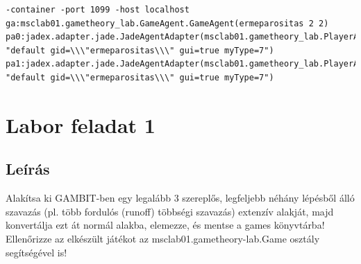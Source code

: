 \begin{lstlisting}[caption=érmepárosítás run config, frame=single,float=!ht]
-container -port 1099 -host localhost 
ga:msclab01.gametheory_lab.GameAgent.GameAgent(ermeparositas 2 2) 
pa0:jadex.adapter.jade.JadeAgentAdapter(msclab01.gametheory_lab.PlayerAgent.Player 
"default gid=\\\"ermeparositas\\\" gui=true myType=7") 
pa1:jadex.adapter.jade.JadeAgentAdapter(msclab01.gametheory_lab.PlayerAgent.Player 
"default gid=\\\"ermeparositas\\\" gui=true myType=7")
\end{lstlisting}
		



\section{Labor feladat 1}
\subsection{Leírás}
Alakítsa ki GAMBIT-ben egy legalább 3 szereplős, legfeljebb néhány lépésből álló szavazás (pl. több fordulós (runoff) többségi szavazás) extenzív alakját, majd konvertálja ezt át normál alakba, elemezze, és mentse a games könyvtárba! Ellenőrizze az elkészült játékot az msclab01.gametheory-lab.Game osztály segítségével is! 
